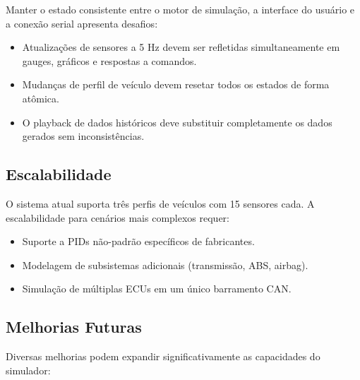 Manter o estado consistente entre o motor de simulação, a interface do usuário e a conexão serial apresenta desafios:

\begin{itemize}
    \item Atualizações de sensores a 5 Hz devem ser refletidas simultaneamente em gauges, gráficos e respostas a comandos.
    \item Mudanças de perfil de veículo devem resetar todos os estados de forma atômica.
    \item O playback de dados históricos deve substituir completamente os dados gerados sem inconsistências.
\end{itemize}

\subsection{Escalabilidade}

O sistema atual suporta três perfis de veículos com 15 sensores cada. A escalabilidade para cenários mais complexos requer:

\begin{itemize}
    \item Suporte a PIDs não-padrão específicos de fabricantes.
    \item Modelagem de subsistemas adicionais (transmissão, ABS, airbag).
    \item Simulação de múltiplas ECUs em um único barramento CAN.
\end{itemize}

\subsection{Melhorias Futuras}

Diversas melhorias podem expandir significativamente as capacidades do simulador:

